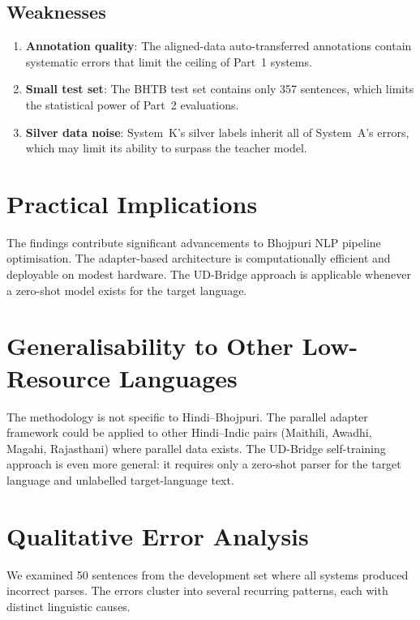 \documentclass[12pt,a4paper,oneside]{report}
\begin{document}
\subsection{Weaknesses}
\begin{enumerate}
  \item \textbf{Annotation quality}: The aligned-data auto-transferred annotations
        contain systematic errors that limit the ceiling of Part~1 systems.
  \item \textbf{Small test set}: The BHTB test set contains only 357 sentences,
        which limits the statistical power of Part~2 evaluations.
  \item \textbf{Silver data noise}: System~K's silver labels inherit all of
        System~A's errors, which may limit its ability to surpass the teacher model.
\end{enumerate}

\section{Practical Implications}

The findings contribute significant advancements to Bhojpuri NLP pipeline
optimisation. The adapter-based architecture is computationally efficient and
deployable on modest hardware. The UD-Bridge approach is applicable whenever
a zero-shot model exists for the target language.

\section{Generalisability to Other Low-Resource Languages}

The methodology is not specific to Hindi--Bhojpuri. The parallel adapter framework
could be applied to other Hindi--Indic pairs (Maithili, Awadhi, Magahi, Rajasthani)
where parallel data exists. The UD-Bridge self-training approach is even more
general: it requires only a zero-shot parser for the target language and unlabelled
target-language text.

\section{Qualitative Error Analysis}

We examined 50 sentences from the development set where all systems produced
incorrect parses. The errors cluster into several recurring patterns, each with
distinct linguistic causes.
\end{document}
